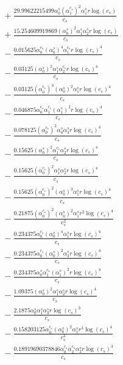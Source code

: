 \documentclass[10pt]{article}
\begin{document}
\begin{align*}
&{}  + \frac{29.99622215499 \alpha_{0}^s \left(\alpha_{1}^{c_s}\right)^{2} \alpha_{1}^s r \log{\left(c_{s} \right)}}{c_{s}} \\
&{}  + \frac{15.254609919869 \left(\alpha_{0}^s\right)^{2} \alpha_{1}^s \alpha_{2}^s r \log{\left(c_{s} \right)}}{c_{s}} \\
&{}  - \frac{0.015625 \alpha_{0}^{c_s} \left(\alpha_{0}^s\right)^{4} \alpha_{1}^{c_s} r \log{\left(c_{s} \right)}^{4}}{c_{s}} \\
&{}  - \frac{0.03125 \left(\alpha_{0}^s\right)^{2} \alpha_{1}^s \alpha_{2}^{c_s} r \log{\left(c_{s} \right)}^{4}}{c_{s}} \\
&{}  - \frac{0.03125 \left(\alpha_{0}^{c_s}\right)^{3} \left(\alpha_{0}^s\right)^{2} \alpha_{1}^s r \log{\left(c_{s} \right)}^{4}}{c_{s}} \\
&{}  - \frac{0.046875 \alpha_{0}^{c_s} \alpha_{1}^{c_s} \left(\alpha_{1}^s\right)^{2} r \log{\left(c_{s} \right)}^{4}}{c_{s}} \\
&{}  - \frac{0.078125 \left(\alpha_{0}^{c_s}\right)^{2} \alpha_{0}^s \alpha_{3}^s r \log{\left(c_{s} \right)}^{4}}{c_{s}} \\
&{}  - \frac{0.15625 \left(\alpha_{0}^s\right)^{2} \alpha_{1}^{c_s} \alpha_{2}^s r \log{\left(c_{s} \right)}^{4}}{c_{s}} \\
&{}  - \frac{0.15625 \left(\alpha_{0}^{c_s}\right)^{2} \alpha_{1}^s \alpha_{2}^s r \log{\left(c_{s} \right)}^{4}}{c_{s}} \\
&{}  - \frac{0.15625 \left(\alpha_{0}^{c_s}\right)^{2} \left(\alpha_{0}^s\right)^{3} \alpha_{1}^s r \log{\left(c_{s} \right)}^{4}}{c_{s}} \\
&{}  - \frac{0.21875 \left(\alpha_{0}^{c_s}\right)^{2} \left(\alpha_{0}^s\right)^{2} \alpha_{1}^s r^{2} \log{\left(c_{s} \right)}^{4}}{c_{s}^{2}} \\
&{}  - \frac{0.234375 \alpha_{0}^{c_s} \left(\alpha_{0}^s\right)^{4} \alpha_{1}^s r \log{\left(c_{s} \right)}^{4}}{c_{s}} \\
&{}  - \frac{0.234375 \alpha_{0}^{c_s} \left(\alpha_{0}^s\right)^{2} \alpha_{3}^s r \log{\left(c_{s} \right)}^{4}}{c_{s}} \\
&{}  - \frac{0.234375 \alpha_{0}^s \alpha_{1}^{c_s} \left(\alpha_{1}^s\right)^{2} r \log{\left(c_{s} \right)}^{4}}{c_{s}} \\
&{}  - \frac{1.09375 \left(\alpha_{0}^s\right)^{2} \alpha_{1}^s \alpha_{2}^s r \log{\left(c_{s} \right)}^{4}}{c_{s}} \\
&{}  - \frac{2.1875 \alpha_{0}^s \alpha_{1}^s \alpha_{3}^s r \log{\left(c_{s} \right)}^{3}}{c_{s}} \\
&{}  - \frac{0.158203125 \alpha_{0}^{c_s} \left(\alpha_{0}^s\right)^{2} \alpha_{1}^s r^{3} \log{\left(c_{s} \right)}^{4}}{c_{s}^{3}} \\
&{}  - \frac{0.18919690378846 \alpha_{0}^{c_s} \alpha_{2}^{c_s} \alpha_{2}^s r \log{\left(c_{s} \right)}^{3}}{c_{s}}
\end{align*}
\end{document}
